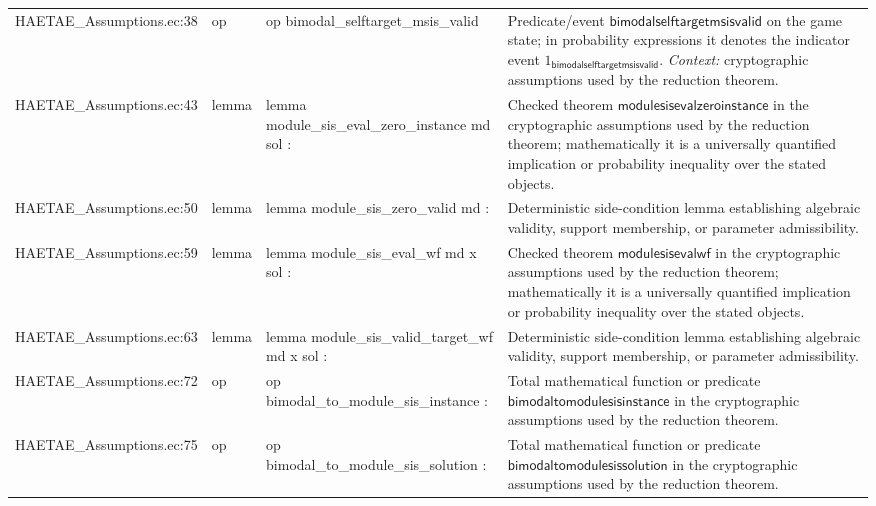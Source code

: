 \documentclass[10pt]{article}
\begin{document}
\begin{longtable}{L{0.11\textwidth}L{0.055\textwidth}L{0.385\textwidth}L{0.41\textwidth}}
HAETAE\_\allowbreak{}Assumptions.\allowbreak{}ec:\allowbreak{}38 & op & {\ttfamily\scriptsize op bimodal\_\allowbreak{}selftarget\_\allowbreak{}msis\_\allowbreak{}valid} & Predicate/event $\mathsf{bimodalselftargetmsisvalid}$ on the game state; in probability expressions it denotes the indicator event $1_{\mathsf{bimodalselftargetmsisvalid}}$. \emph{Context:} cryptographic assumptions used by the reduction theorem. \\
HAETAE\_\allowbreak{}Assumptions.\allowbreak{}ec:\allowbreak{}43 & lemma & {\ttfamily\scriptsize lemma module\_\allowbreak{}sis\_\allowbreak{}eval\_\allowbreak{}zero\_\allowbreak{}instance md sol :} & Checked theorem $\mathsf{modulesisevalzeroinstance}$ in the cryptographic assumptions used by the reduction theorem; mathematically it is a universally quantified implication or probability inequality over the stated objects. \\
HAETAE\_\allowbreak{}Assumptions.\allowbreak{}ec:\allowbreak{}50 & lemma & {\ttfamily\scriptsize lemma module\_\allowbreak{}sis\_\allowbreak{}zero\_\allowbreak{}valid md :} & Deterministic side-condition lemma establishing algebraic validity, support membership, or parameter admissibility. \\
HAETAE\_\allowbreak{}Assumptions.\allowbreak{}ec:\allowbreak{}59 & lemma & {\ttfamily\scriptsize lemma module\_\allowbreak{}sis\_\allowbreak{}eval\_\allowbreak{}wf md x sol :} & Checked theorem $\mathsf{modulesisevalwf}$ in the cryptographic assumptions used by the reduction theorem; mathematically it is a universally quantified implication or probability inequality over the stated objects. \\
HAETAE\_\allowbreak{}Assumptions.\allowbreak{}ec:\allowbreak{}63 & lemma & {\ttfamily\scriptsize lemma module\_\allowbreak{}sis\_\allowbreak{}valid\_\allowbreak{}target\_\allowbreak{}wf md x sol :} & Deterministic side-condition lemma establishing algebraic validity, support membership, or parameter admissibility. \\
HAETAE\_\allowbreak{}Assumptions.\allowbreak{}ec:\allowbreak{}72 & op & {\ttfamily\scriptsize op bimodal\_\allowbreak{}to\_\allowbreak{}module\_\allowbreak{}sis\_\allowbreak{}instance :} & Total mathematical function or predicate $\mathsf{bimodaltomodulesisinstance}$ in the cryptographic assumptions used by the reduction theorem. \\
HAETAE\_\allowbreak{}Assumptions.\allowbreak{}ec:\allowbreak{}75 & op & {\ttfamily\scriptsize op bimodal\_\allowbreak{}to\_\allowbreak{}module\_\allowbreak{}sis\_\allowbreak{}solution :} & Total mathematical function or predicate $\mathsf{bimodaltomodulesissolution}$ in the cryptographic assumptions used by the reduction theorem. \\

\end{longtable}
\end{document}
